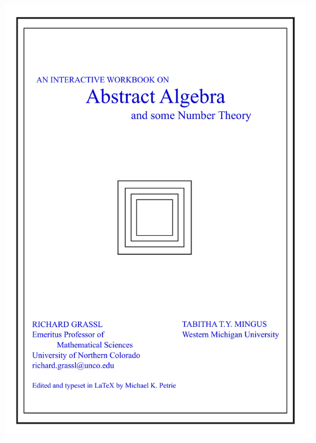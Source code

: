 \documentclass[12pt]{book}
\theoremstyle{definition}
\begin{document}
\centerline{\includegraphics[width=6in]{coverpage2.pdf}}

\clearpage



\cleardoublepage
\end{document}
